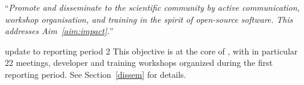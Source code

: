 \begin{compactenum}[\bf O1\rm:]
\item \label{objective:disseminate} ``\emph{Promote and disseminate
  \ODK to the scientific community by active communication,
  workshop organisation, and training in the spirit of open-source
  software. This addresses Aim~\ref{aim:impact}.}''

\begin{oldpart}{update to reporting period 2}
  This objective is at the core of , with in particular
  22 meetings, developer and training workshops organized during the
  first reporting period. See Section~\ref{dissem} for details.
\end{oldpart}
\end{compactenum}


